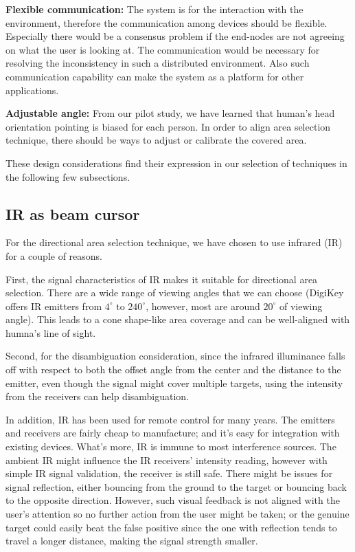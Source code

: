 {\bf Flexible communication:} The system is for the interaction with the environment, therefore the communication among devices should be flexible. Especially there would be a consensus problem if the end-nodes are not agreeing on what the user is looking at. The communication would be necessary for resolving the inconsistency in such a distributed environment. Also such communication capability can make the system as a platform for other applications. 

{\bf Adjustable angle:} From our pilot study, we have learned that human's head orientation pointing is biased for each person. In order to align area selection technique, there should be ways to adjust or calibrate the covered area.

These design considerations find their expression in our selection of techniques in the following few subsections.

\subsection{IR as beam cursor}
\label{sec:ir-as-beam}

For the directional area selection technique, we have chosen to use infrared (IR) for a couple of reasons.  

First, the signal characteristics of IR makes it suitable for directional area selection. There are a wide range of viewing angles that we can choose (DigiKey offers IR emitters from $4^\circ$ to $240^\circ$, however, most are around $20^\circ$ of viewing angle). This leads to a cone shape-like area coverage and can be well-aligned with humna's line of sight. 

Second, for the disambiguation consideration, since the infrared illuminance falls off with respect to both the offset angle from the center and the distance to the emitter, even though the signal might cover multiple targets, using the intensity from the receivers can help disambiguation.  

In addition, IR has been used for remote control for many years. The emitters and receivers are fairly cheap to manufacture; and it's easy for integration with existing devices. 
What's more, IR is immune to most interference sources. The ambient IR might influence the IR receivers' intensity reading, however with simple IR signal validation, the receiver is still safe. There might be issues for signal reflection, either bouncing from the ground to the target or bouncing back to the opposite direction. However, such visual feedback is not aligned with the user's attention so no further action from the user might be taken; or the genuine target could easily beat the false positive since the one with reflection tends to travel a longer distance, making the signal strength smaller.


